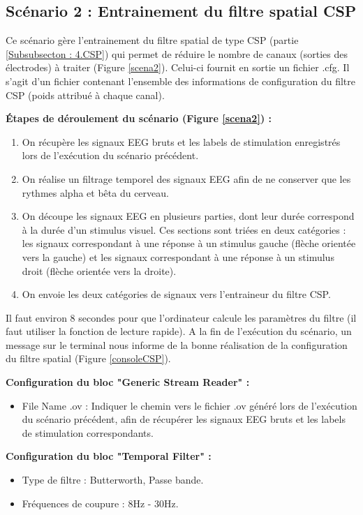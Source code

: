 \subsection{Scénario 2 : Entrainement du filtre spatial CSP}
\label{Subsection : 6.Scénario 2}
Ce scénario gère l'entrainement du filtre spatial de type CSP (partie \ref{Subsubsecton : 4.CSP})  qui permet de réduire le nombre de canaux (sorties des électrodes) à traiter (Figure \ref{scena2}). Celui-ci fournit en sortie un fichier .cfg. Il s'agit d'un fichier contenant l'ensemble des informations de configuration du filtre CSP (poids attribué à chaque canal).

\textbf{Étapes de déroulement du scénario (Figure \ref{scena2}) : }
\begin{enumerate}
	\item On récupère les signaux EEG bruts et les labels de stimulation enregistrés lors de l'exécution du scénario précédent. 
	\smallbreak
	\item On réalise un filtrage temporel des signaux EEG afin de ne conserver que les rythmes alpha et bêta du cerveau.
	\smallbreak
	\item On découpe les signaux EEG en plusieurs parties, dont leur durée correspond à la durée d'un stimulus visuel. Ces sections sont triées en deux catégories : les signaux correspondant à une réponse à un stimulus gauche (flèche orientée vers la gauche) et les signaux correspondant à une réponse à un stimulus droit (flèche orientée vers la droite).
	\smallbreak
	\item On envoie les deux catégories de signaux vers l'entraineur du filtre CSP.
\end{enumerate}

Il faut environ 8 secondes pour que l'ordinateur calcule les paramètres du filtre (il faut utiliser la fonction de lecture rapide). A la fin de l'exécution du scénario, un message sur le terminal nous informe de la bonne réalisation de la configuration du filtre spatial (Figure \ref{consoleCSP}).

\smallbreak
\textbf{Configuration du bloc "Generic Stream Reader" : }
\smallbreak
\begin{itemize}
	\item File Name .ov : Indiquer le chemin vers le fichier .ov généré lors de l'exécution du scénario précédent, afin de récupérer les signaux EEG bruts et les labels de stimulation correspondants.
	\smallbreak
\end{itemize}

\smallbreak
\textbf{Configuration du bloc "Temporal Filter" : }
\smallbreak
\begin{itemize}
	\item Type de filtre : Butterworth, Passe bande.
	\smallbreak
	\item Fréquences de coupure : 8Hz - 30Hz.
\end{itemize}

